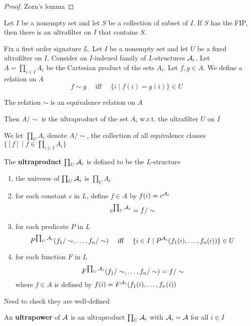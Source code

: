 \documentclass[11pt]{article}
\begin{document}
\begin{proof}
Zorn's lemma
\end{proof}

\begin{corollary}[]
\label{corB.5}
Let \(I\) be a nonempty set and let \(S\) be a collection of subset of \(I\). If \(S\) has the
FIP, then there is an ultrafilter on \(I\) that contains \(S\).
\end{corollary}

Fix a first order signature \(L\). Let \(I\) be a nonempty set and let \(U\) be a fixed
ultrafilter on \(I\). Consider an \(I\)-indexed family of \(L\)-structures \(\mathcal{A}_i\).
Let \(A=\prod_{i\in I}A_i\) be the Cartesian product of the sets \(A_i\). Let \(f,g\in A\). We
define a relation on \(A\)
\begin{equation*}
  f\sim g \quad\text{ iff }\quad
  \{i\mid f(i)=g(i)\}\in U
\end{equation*}
\begin{lemma}[]
\label{lemmaB.6}
The relation \(\sim\) is an equivalence relation on \(A\)
\end{lemma}

Then \(A/\sim\) is the ultraproduct of the set \(A_i\) w.r.t. the ultrafilter \(U\) on \(I\)

We let \(\prod_UA_i\) denote \(A/\sim\), the collection of all equivalence classes
\(\{[f]\mid f\in\prod_{i\in I}A_i\}\)

\begin{definition}[]
The \textbf{ultraproduct} \(\prod_{U}\mathcal{A}_i\) is defined to be the \(L\)-structure
\begin{enumerate}
\item the universe of \(\prod_{U}\mathcal{A}_i\) is \(\prod_UA_i\)
\item for each constant \(c\) in \(L\), define \(f\in A\) by \(f(i)=c^{\mathcal{A}_i}\)
 \begin{equation*}
c^{\prod_U\mathcal{A}_i}=f/\sim
 \end{equation*}
\item for each predicate \(P\) in \(L\)
 \begin{equation*}
P^{\prod_U\mathcal{A}_i}(f_1/\sim,\dots,f_n/\sim)\quad\text{ iff }\quad
\{i\in I\mid P^{\mathcal{A}_i}(f_1(i),\dots,f_n(i))\}\in U
 \end{equation*}
\item for each function \(F\) in \(L\)
 \begin{equation*}
F^{\prod_U\mathcal{A}_i}(f_1/\sim,\dots,f_n/\sim)=f/\sim
 \end{equation*}
where \(f\in A\) is defined by \(f(i)=F^{\mathcal{A}_i}(f_1(i),\dots,f_n(i))\)
\end{enumerate}


Need to check they are well-defined

An \textbf{ultrapower} of \(\mathcal{A}\) is an ultraproduct \(\prod_U\mathcal{A}_i\) with \(\mathcal{A}_i=\mathcal{A}\) for
all \(i\in I\)
\end{definition}
\end{document}
